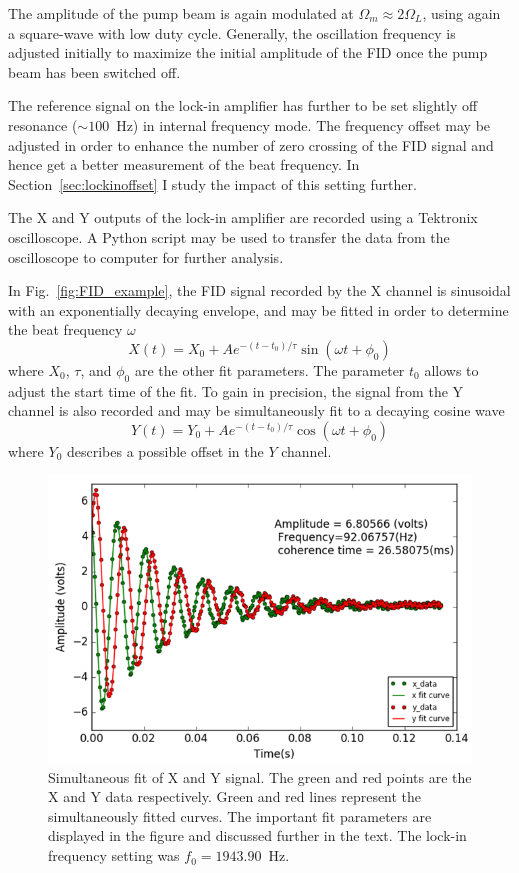 The amplitude of the pump beam is again modulated at $\Omega_m\approx
2\Omega_L$, using again a square-wave with low duty cycle.  Generally,
the oscillation frequency is adjusted initially to maximize the
initial amplitude of the FID once the pump beam has been switched off.

The reference signal on the lock-in amplifier has further to be set
slightly off resonance ($\sim 100$~Hz) in internal frequency mode.
The frequency offset may be adjusted in order to enhance the number of
zero crossing of the FID signal and hence get a better measurement of
the beat frequency.  In Section~\ref{sec:lockinoffset} I study the
impact of this setting further.

The X and Y outputs of the lock-in amplifier are recorded using a
Tektronix oscilloscope.  A Python script may be used to transfer the
data from the oscilloscope to computer for further analysis.

In Fig.~\ref{fig:FID_example}, the FID signal recorded by the X
channel is sinusoidal with an exponentially decaying envelope, and may
be fitted in order to determine the beat frequency $\omega$
\begin{equation}
X(t)=X_0+Ae^{-(t-t_0)/\tau}\sin(\omega
t+\phi_0)\label{eq:decaying_sinwave}
\end{equation}  
where $X_0$, $\tau$, and $\phi_0$ are the other fit parameters.  The
parameter $t_0$ allows to adjust the start time of the fit.  To gain
in precision, the signal from the Y channel is also recorded and may
be simultaneously fit to a decaying cosine wave
\begin{equation}
Y(t)=Y_0+Ae^{-(t-t_0)/\tau}\cos(\omega
t+\phi_0)\label{eq:decaying_coswave}
\end{equation}
where $Y_0$ describes a possible offset in the $Y$ channel.

\begin{figure}%
\centering\includegraphics[width=0.55\linewidth]{figures/fid_simultaneous}
\caption{Simultaneous fit of X and Y signal.  The green and red points
  are the X and Y data respectively.  Green and red lines represent
  the simultaneously fitted curves.  The important fit parameters are
  displayed in the figure and discussed further in the text.  The
  lock-in frequency setting was $f_0=1943.90$~Hz.\label{fig:FID_fit}}
\end{figure}

